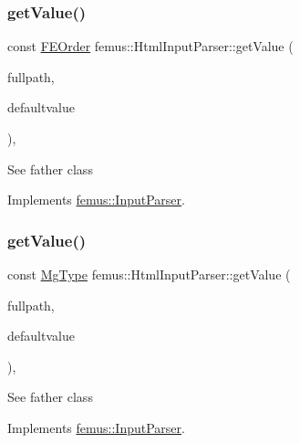 \subsubsection{\texorpdfstring{get\+Value()}{getValue()}\hspace{0.1cm}{\footnotesize\ttfamily [5/6]}}
{\footnotesize\ttfamily const \mbox{\hyperlink{_f_elem_type_enum_8hpp_a00ea9562f0dbb25e22bb3297d596e3ba}{F\+E\+Order}} femus\+::\+Html\+Input\+Parser\+::get\+Value (\begin{DoxyParamCaption}\item[{const std\+::string \&}]{fullpath,  }\item[{const \mbox{\hyperlink{_f_elem_type_enum_8hpp_a00ea9562f0dbb25e22bb3297d596e3ba}{F\+E\+Order}}}]{defaultvalue }\end{DoxyParamCaption})\hspace{0.3cm}{\ttfamily [inline]}, {\ttfamily [virtual]}}

See father class 

Implements \mbox{\hyperlink{classfemus_1_1_input_parser_afed8cdbe224355e291485f85dcf3a051}{femus\+::\+Input\+Parser}}.

\mbox{\label{classfemus_1_1_html_input_parser_aad4f0541fa07993859ea2bc740b76aaa}} 
\subsubsection{\texorpdfstring{get\+Value()}{getValue()}\hspace{0.1cm}{\footnotesize\ttfamily [6/6]}}
{\footnotesize\ttfamily const \mbox{\hyperlink{_mg_type_enum_8hpp_a35aafc39068a269f658aac64338aa781}{Mg\+Type}} femus\+::\+Html\+Input\+Parser\+::get\+Value (\begin{DoxyParamCaption}\item[{const std\+::string \&}]{fullpath,  }\item[{const \mbox{\hyperlink{_mg_type_enum_8hpp_a35aafc39068a269f658aac64338aa781}{Mg\+Type}}}]{defaultvalue }\end{DoxyParamCaption})\hspace{0.3cm}{\ttfamily [inline]}, {\ttfamily [virtual]}}

See father class 

Implements \mbox{\hyperlink{classfemus_1_1_input_parser_a8ce06a6bc1112d4581b6fad9e7aad858}{femus\+::\+Input\+Parser}}.

